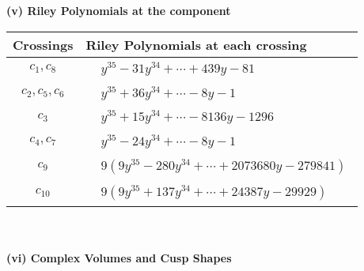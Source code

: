 \documentclass[1p]{elsarticle_modified}
\theoremstyle{definition}
\begin{document}
\newpage\renewcommand{\arraystretch}{1}
\flushleft \textbf{(v) Riley Polynomials at the component}\newline \\
\begin{tabular}{m{50pt}|m{274pt}}
Crossings & \hspace{64pt}Riley Polynomials at each crossing \\
\hline $$\begin{aligned}c_{1},c_{8}\end{aligned}$$&$\begin{aligned}
&y^{35}-31 y^{34}+\cdots+439 y-81
\end{aligned}$\\
\hline $$\begin{aligned}c_{2},c_{5},c_{6}\end{aligned}$$&$\begin{aligned}
&y^{35}+36 y^{34}+\cdots-8 y-1
\end{aligned}$\\
\hline $$\begin{aligned}c_{3}\end{aligned}$$&$\begin{aligned}
&y^{35}+15 y^{34}+\cdots-8136 y-1296
\end{aligned}$\\
\hline $$\begin{aligned}c_{4},c_{7}\end{aligned}$$&$\begin{aligned}
&y^{35}-24 y^{34}+\cdots-8 y-1
\end{aligned}$\\
\hline $$\begin{aligned}c_{9}\end{aligned}$$&$\begin{aligned}
&9(9 y^{35}-280 y^{34}+\cdots+2073680 y-279841)
\end{aligned}$\\
\hline $$\begin{aligned}c_{10}\end{aligned}$$&$\begin{aligned}
&9(9 y^{35}+137 y^{34}+\cdots+24387 y-29929)
\end{aligned}$\\
\hline
\end{tabular}\\~\\
\newpage\flushleft \textbf{(vi) Complex Volumes and Cusp Shapes}
\end{document}
